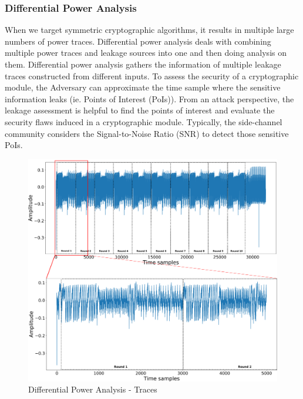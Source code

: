 \documentclass[runningheads]{llncs}
\begin{document}
\subsubsection{Differential Power Analysis}
When we target symmetric cryptographic algorithms, it results in multiple large numbers of power traces. Differential power analysis deals with
combining multiple power traces and leakage sources into one and then doing analysis on them. Differential power analysis gathers the information of multiple leakage traces constructed from different inputs. 
To assess the security of a cryptographic module, the Adversary can approximate the time sample where the sensitive information leaks (ie. Points of Interest (PoIs)). From an attack perspective, the leakage assessment is helpful to find the points of interest and evaluate the security flaws induced in a cryptographic module. Typically, the side-channel community considers the Signal-to-Noise Ratio (SNR) to detect those sensitive PoIs.
\begin{figure}
    \includegraphics[width=\textwidth]{images/DPA.png}
    \caption{Differential Power Analysis - Traces} \label{fig7}
\end{figure}
\end{document}
